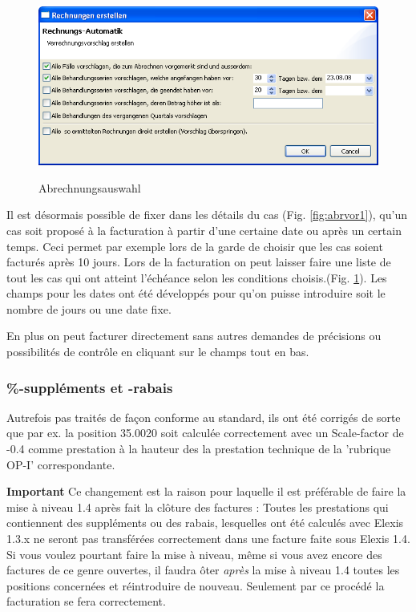 \documentclass[a4paper]{scrartcl}
\begin{document}
\begin{figure}
  \includegraphics{abrvor2}\\
  \caption{Abrechnungsauswahl}\label{fig:abrvor2}
\end{figure}

Il est désormais possible de fixer dans les détails du cas (Fig. \ref{fig:abrvor1}), qu'un cas soit proposé à la facturation à partir d'une certaine date ou après un certain temps. Ceci permet par exemple lors de la garde de choisir que les cas soient facturés après 10 jours. Lors de la facturation on peut laisser faire une liste de tout les cas qui ont atteint l'échéance selon les conditions choisis.(Fig. \ref{fig:abrvor2}). Les champs pour les dates ont été développés pour qu'on puisse introduire soit le nombre de jours ou une date fixe.

En plus on peut facturer directement sans autres demandes de précisions ou possibilités de contrôle en cliquant sur le champs tout en bas.
\subsubsection{\%-suppléments et -rabais}
Autrefois pas traités de façon conforme au standard, ils ont été corrigés de sorte que par ex. la position 35.0020 soit calculée correctement avec un Scale-factor de -0.4 comme prestation à la hauteur des la prestation technique de la 'rubrique OP-I' correspondante.

\textbf{Important} Ce changement est la raison pour laquelle il est préférable de faire la mise à niveau 1.4 après fait la clôture des factures : Toutes les prestations qui contiennent des suppléments ou des rabais, lesquelles ont été calculés avec Elexis 1.3.x ne seront pas transférées correctement dans une facture faite sous Elexis 1.4. Si vous voulez pourtant faire la mise à niveau, même si vous avez encore des factures de ce genre ouvertes, il faudra ôter \textit{après} la mise à niveau 1.4 toutes les positions concernées et réintroduire de nouveau. Seulement par ce procédé la facturation se fera correctement.
\end{document}
